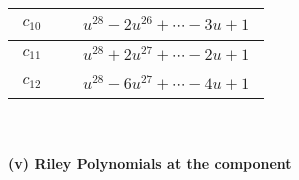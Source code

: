 \documentclass[1p]{elsarticle_modified}
\theoremstyle{definition}
\begin{document}
\begin{tabular}{m{50pt}|m{274pt}}
\hline $$\begin{aligned}c_{10}\end{aligned}$$&$\begin{aligned}
&u^{28}-2 u^{26}+\cdots-3 u+1
\end{aligned}$\\
\hline $$\begin{aligned}c_{11}\end{aligned}$$&$\begin{aligned}
&u^{28}+2 u^{27}+\cdots-2 u+1
\end{aligned}$\\
\hline $$\begin{aligned}c_{12}\end{aligned}$$&$\begin{aligned}
&u^{28}-6 u^{27}+\cdots-4 u+1
\end{aligned}$\\
\hline
\end{tabular}\\~\\
\newpage\renewcommand{\arraystretch}{1}
\flushleft \textbf{(v) Riley Polynomials at the component}\newline \\
\end{document}
